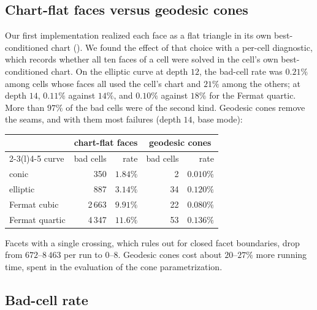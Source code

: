 \documentclass[11pt]{article}
\theoremstyle{plain}
\theoremstyle{definition}
\theoremstyle{remark}
\begin{document}
\subsection{Chart-flat faces versus geodesic cones}
\label{sec:exp-faces}

Our first implementation realized each face as a flat triangle in its own
best-conditioned chart (). We found the effect of that
choice with a per-cell diagnostic, which records whether all ten faces
of a cell were solved in the cell's own best-conditioned chart. On the
elliptic curve at depth $12$, the bad-cell rate was $0.21\%$ among cells
whose faces all used the cell's chart and $21\%$ among the others; at
depth $14$, $0.11\%$ against $14\%$, and $0.10\%$ against $18\%$ for the
Fermat quartic. More than $97\%$ of the bad cells were of the second
kind. Geodesic cones remove the seams, and with them most failures
(depth $14$, base mode):
\begin{center}
\small
\begin{tabular}{@{}lrrrr@{}}
\toprule
& \multicolumn{2}{c}{chart-flat faces} & \multicolumn{2}{c}{geodesic cones} \\
\cmidrule(lr){2-3}\cmidrule(l){4-5}
curve & bad cells & rate & bad cells & rate \\
\midrule
conic & 350 & $1.84\%$ & 2 & $0.010\%$ \\
elliptic & 887 & $3.14\%$ & 34 & $0.120\%$ \\
Fermat cubic & 2\,663 & $9.91\%$ & 22 & $0.080\%$ \\
Fermat quartic & 4\,347 & $11.6\%$ & 53 & $0.136\%$ \\
\bottomrule
\end{tabular}
\end{center}
Facets with a single crossing, which  rules out for
closed facet boundaries, drop from $672$--$8\,463$ per run to $0$--$8$.
Geodesic cones cost about $20$--$27\%$ more running time, spent in the
evaluation of the cone parametrization.

\subsection{Bad-cell rate}
\label{sec:exp-badrate}
\end{document}
